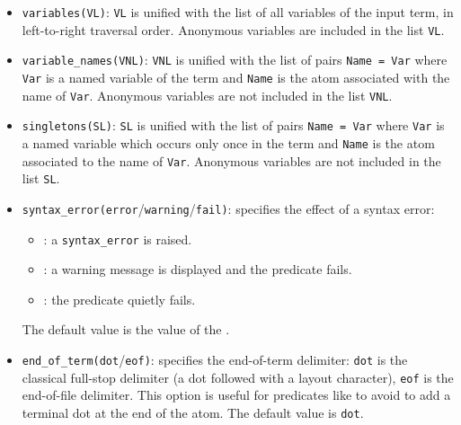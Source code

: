 \begin{itemize}

\item {}\texttt{variables(VL)}: \texttt{VL} is unified with the
list of all variables of the input term, in left-to-right traversal
order. Anonymous variables are included in the list \texttt{VL}.

\item {}\texttt{variable\_names(VNL)}: \texttt{VNL} is
unified with the list of pairs \texttt{Name = Var} where \texttt{Var} is a
named variable of the term and \texttt{Name} is the atom associated with the
name of \texttt{Var}.  Anonymous variables are not included in the list
\texttt{VNL}.

\item {}\texttt{singletons(SL)}: \texttt{SL} is unified with the
list of pairs \texttt{Name = Var} where \texttt{Var} is a named variable
which occurs only once in the term and \texttt{Name} is the atom associated
to the name of \texttt{Var}. Anonymous variables are not included in the list
\texttt{SL}.

\item {}\texttt{syntax\_error(error}/\texttt{warning}/\texttt{fail)}:
specifies the effect of a syntax error:

\begin{itemize}

\item {}: a \texttt{syntax\_error} is raised.

\item {}: a warning message is displayed and the predicate
fails.

\item {}: the predicate quietly fails.

\end{itemize}

The default value is the value of the 
 .

\item {}\texttt{end\_of\_term(dot}/\texttt{eof)}: specifies the
end-of-term delimiter: \texttt{dot} is the classical full-stop delimiter (a
dot followed with a layout character), \texttt{eof} is the end-of-file
delimiter. This option is useful for predicates like
  to avoid to add a
terminal dot at the end of the atom. The default value is \texttt{dot}.

\end{itemize}

